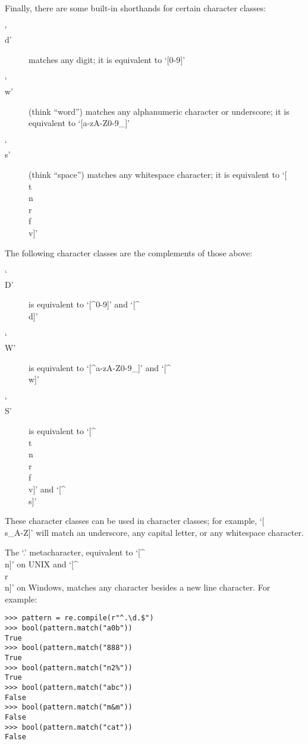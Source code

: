 Finally, there are some built-in shorthands for certain character classes: 
\begin{description}
    \item[`\\d'] matches any digit; it is equivalent to `[0-9]'
    \item[`\\w'] (think ``word'') matches any alphanumeric character or underscore; it is equivalent to `[a-zA-Z0-9_]'
    \item[`\\s'] (think ``space'') matches any whitespace character; it is equivalent to `[ \\t\\n\\r\\f\\v]'
\end{description}
The following character classes are the complements of those above:
\begin{description}
    \item[`\\D'] is equivalent to `[^0-9]' and `[^\\d]'
    \item[`\\W'] is equivalent to `[^a-zA-Z0-9_]' and `[^\\w]'
    \item[`\\S'] is equivalent to `[^ \\t\\n\\r\\f\\v]' and `[^\\s]'
\end{description}

These character classes can be used in character classes; for example, `[\\s_A-Z]' will match an underscore, any capital letter, or any whitespace character.

The `.' metacharacter, equivalent to `[^\\n]' on UNIX and `[^\\r\\n]' on Windows, matches any character besides a new line character.
For example:
\begin{lstlisting}
>>> pattern = re.compile(r"^.\d.$")
>>> bool(pattern.match("a0b"))
True
>>> bool(pattern.match("888"))
True
>>> bool(pattern.match("n2%"))
True
>>> bool(pattern.match("abc"))
False
>>> bool(pattern.match("m&m"))
False
>>> bool(pattern.match("cat"))
False
\end{lstlisting}

